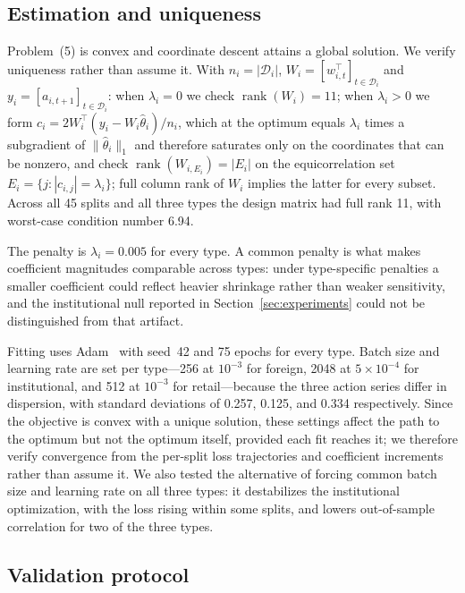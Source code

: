 \documentclass[sigconf,anonymous,review]{acmart}
\begin{document}
\subsection{Estimation and uniqueness}
\label{sec:method-estimation}

Problem~(5) is convex and coordinate descent attains a global solution.
We verify uniqueness rather than assume it. With $n_i = |\mathcal{D}_i|$,
$W_i = [w_{i,t}^{\top}]_{t \in \mathcal{D}_i}$ and
$y_i = [a_{i,t+1}]_{t \in \mathcal{D}_i}$: when $\lambda_i = 0$ we check
$\operatorname{rank}(W_i) = 11$; when $\lambda_i > 0$ we form
$c_i = 2 W_i^{\top}(y_i - W_i \hat\theta_i) / n_i$, which at the optimum
equals $\lambda_i$ times a subgradient of $\lVert \hat\theta_i \rVert_1$ and
therefore saturates only on the coordinates that can be nonzero, and check
$\operatorname{rank}(W_{i,E_i}) = |E_i|$ on the equicorrelation set
$E_i = \{ j : |c_{i,j}| = \lambda_i \}$; full column rank of $W_i$
implies the latter for every subset. Across all 45 splits and all three
types the design matrix had full rank 11, with worst-case condition
number 6.94.

The penalty is $\lambda_i = 0.005$ for every type. A common penalty is
what makes coefficient magnitudes comparable across types: under
type-specific penalties a smaller coefficient could reflect heavier
shrinkage rather than weaker sensitivity, and the institutional null
reported in Section~\ref{sec:experiments} could not be distinguished from
that artifact.

Fitting uses Adam~\cite{kingma2015} with seed~42 and 75 epochs for every
type. Batch size and learning rate are set per type---256 at $10^{-3}$
for foreign, 2048 at $5\times10^{-4}$ for institutional, and 512 at
$10^{-3}$ for retail---because the three action series differ in
dispersion, with standard deviations of 0.257, 0.125, and 0.334
respectively. Since the objective is convex with a unique solution, these
settings affect the path to the optimum but not the optimum itself,
provided each fit reaches it; we therefore verify convergence from the
per-split loss trajectories and coefficient increments rather than assume
it. We also tested the alternative of forcing common batch size and
learning rate on all three types: it destabilizes the institutional
optimization, with the loss rising within some splits, and lowers
out-of-sample correlation for two of the three types.

\subsection{Validation protocol}
\label{sec:method-validation}
\end{document}
